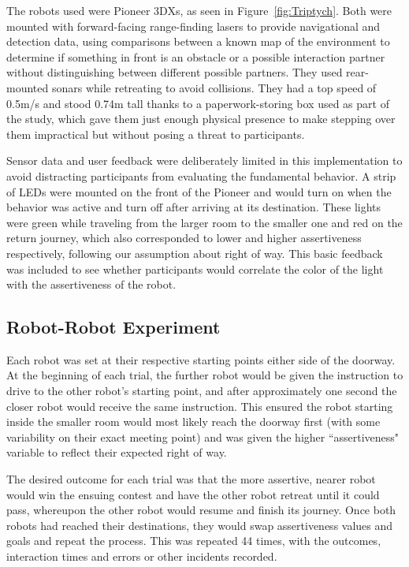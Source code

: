\documentclass[letterpaper, 10 pt, conference]{ieeeconf}  %
\begin{document}
The robots used were Pioneer 3DXs, as seen in Figure~\ref{fig:Triptych}. Both were mounted with forward-facing range-finding lasers to provide navigational and detection data, using comparisons between a known map of the environment to determine if something in front is an obstacle or a possible interaction partner without distinguishing between different possible partners. They used rear-mounted sonars while retreating to avoid collisions. They had a top speed of 0.5m/s and stood 0.74m tall thanks to a paperwork-storing box used as part of the study, which gave them just enough physical presence to make stepping over them impractical but without posing a threat to participants.

Sensor data and user feedback were deliberately limited in this implementation to avoid distracting participants from evaluating the fundamental behavior. A strip of LEDs were mounted on the front of the Pioneer and would turn on when the behavior was active and turn off after arriving at its destination. These lights were green while traveling from the larger room to the smaller one and red on the return journey, which also corresponded to lower and higher assertiveness respectively, following our assumption about right of way. This basic feedback was included to see whether participants would correlate the color of the light with the assertiveness of the robot.


\subsection{Robot-Robot Experiment}

Each robot was set at their respective starting points either side of the doorway. At the beginning of each trial, the further robot would be given the instruction to drive to the other robot’s starting point, and after approximately one second the closer robot would receive the same instruction. This ensured the robot starting inside the smaller room would most likely reach the doorway first (with some variability on their exact meeting point) and was given the higher ``assertiveness" variable to reflect their expected right of way.

The desired outcome for each trial was that the more assertive, nearer robot would win the ensuing contest and have the other robot retreat until it could pass, whereupon the other robot would resume and finish its journey. Once both robots had reached their destinations, they would swap assertiveness values and goals and repeat the process. This was repeated 44 times, with the outcomes, interaction times and errors or other incidents recorded. 
\end{document}
